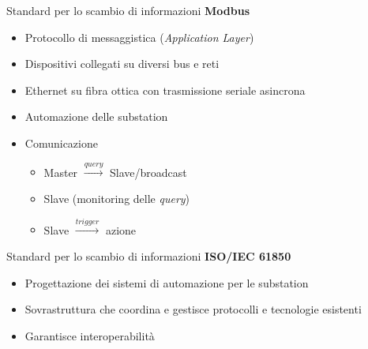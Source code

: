 

\begin{frame}{Standard per lo scambio di informazioni}
	\textbf{Modbus}
	\begin{itemize}[<+- | alert@+>]
		\item Protocollo di messaggistica (\textit{Application Layer})%
		\item Dispositivi collegati su diversi bus e reti
		\item Ethernet su fibra ottica con trasmissione seriale asincrona%
		\item Automazione delle substation%
		\item Comunicazione
			\begin{itemize}[<+- | alert@+>]
			\item Master $\xrightarrow{query}$ Slave/broadcast
			\item Slave (monitoring delle \textit{query})
			\item Slave $\xrightarrow{trigger}$ azione
			\end{itemize}
	\end{itemize}
\end{frame}


\begin{frame}{Standard per lo scambio di informazioni}
	\textbf{ISO/IEC 61850}
	\begin{itemize}[<+- | alert@+>]
		\item Progettazione dei sistemi di automazione per le substation
		\item Sovrastruttura che coordina e gestisce protocolli e tecnologie esistenti
		\item Garantisce interoperabilità
	\end{itemize}
\end{frame}

